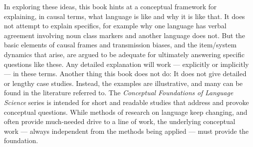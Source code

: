 In exploring these ideas, this book hints at a conceptual framework for explaining, in causal terms, what language is like and why it is like that. It does not attempt to explain specifics, for example why one language has verbal agreement involving noun class markers and another language does not. But the basic elements of causal frames and transmission biases, and the item/system dynamics that arise, are argued to be adequate for ultimately answering specific questions like these. Any detailed explanation will work --- explicitly or implicitly --- in these terms. Another thing this book does not do: It does not give detailed or lengthy case studies. Instead, the examples are illustrative, and many can be found in the literature referred to. The \textit{Conceptual Foundations of Language Science} series is intended for short and readable studies that address and provoke conceptual questions. While methods of research on language keep changing, and often provide much-needed drive to a line of work, the underlying conceptual work --- always independent from the methods being applied --- must provide the foundation.
